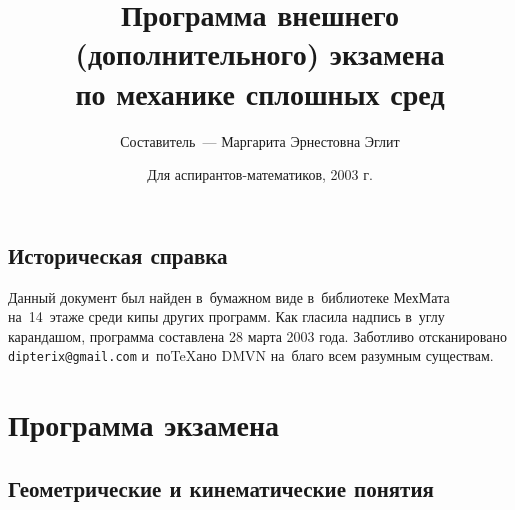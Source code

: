 \documentclass[a4paper,11pt]{article}
\title{Программа внешнего (дополнительного) экзамена\\по механике сплошных сред}
\author{Составитель~--- Маргарита Эрнестовна Эглит}
\date{Для аспирантов-математиков, 2003 г.}
\begin{document}
\maketitle

\subsection*{Историческая справка}

Данный документ был найден в~бумажном виде в~библиотеке МехМата
на~14~этаже среди кипы других программ. Как гласила надпись в~углу карандашом,
программа составлена 28 марта 2003 года. Заботливо отсканировано
\texttt{dipterix@gmail.com} и~по\TeX ано DMVN на~благо всем разумным существам.
\medskip\dmvntrail

\section*{Программа экзамена}

\subsection*{Геометрические и кинематические понятия}
\end{document}
